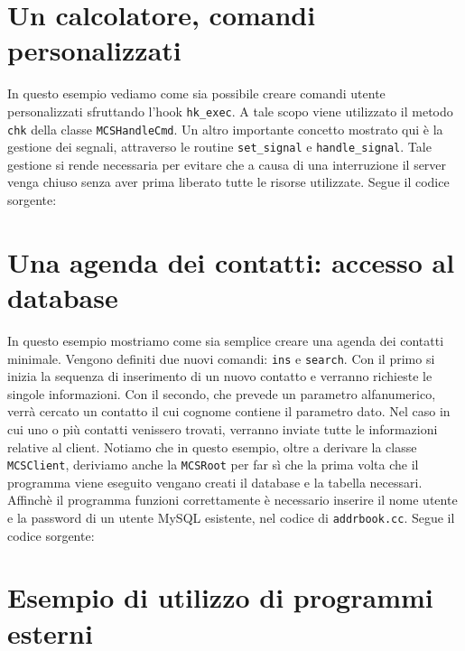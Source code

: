 \section{Un calcolatore, comandi personalizzati}
In questo esempio vediamo come sia possibile creare comandi utente
personalizzati sfruttando l'hook \verb|hk_exec|. A tale scopo viene
utilizzato il metodo \verb|chk| della classe \verb|MCSHandleCmd|. Un
altro importante concetto mostrato qui \`e la gestione dei segnali,
attraverso le routine \verb|set_signal| e \verb|handle_signal|. Tale
gestione si rende necessaria per evitare che a causa di una
interruzione il server venga chiuso senza aver prima liberato tutte le
risorse utilizzate. Segue il codice sorgente: \newline
%
\footnotesize

\normalsize
%

\section{Una agenda dei contatti: accesso al database}
In questo esempio mostriamo come sia semplice creare una agenda dei
contatti minimale. Vengono definiti due nuovi comandi: \verb|ins| e
\verb|search|. Con il primo si inizia la sequenza di inserimento di un
nuovo contatto e verranno richieste le singole informazioni. Con il
secondo, che prevede un parametro alfanumerico, verr\`a cercato un
contatto il cui cognome contiene il parametro dato. Nel caso in cui
uno o pi\`u contatti venissero trovati, verranno inviate tutte le
informazioni relative al client. Notiamo che in questo esempio, oltre
a derivare la classe \verb|MCSClient|, deriviamo anche la
\verb|MCSRoot| per far s\`i che la prima volta che il programma viene
eseguito vengano creati il database e la tabella necessari. Affinch\`e
il programma funzioni correttamente \`e necessario inserire il nome
utente e la password di un utente MySQL esistente, nel codice di
\verb|addrbook.cc|. Segue il codice sorgente: \newline
%
\footnotesize

\normalsize
%

\section{Esempio di utilizzo di programmi esterni}

